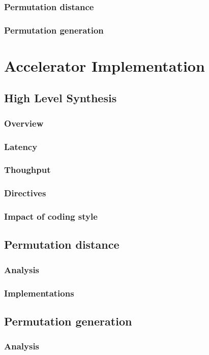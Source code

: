 \documentclass{iccmemoria}
\begin{document}
    \subsection{Permutation distance}
    \subsection{Permutation generation}

\chapter{Accelerator Implementation}
  \section{High Level Synthesis}
    \subsection{Overview}
    \subsection{Latency}
    \subsection{Thoughput}
    \subsection{Directives}
    \subsection{Impact of coding style}
  \section{Permutation distance}
    \subsection{Analysis}
    \subsection{Implementations}
  \section{Permutation generation}
    \subsection{Analysis}
\end{document}
